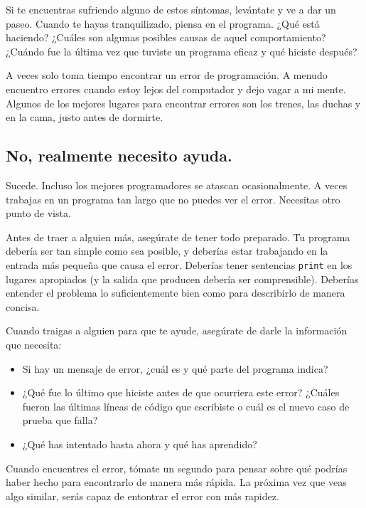 \documentclass[10pt]{book}
\begin{document}
Si te encuentras sufriendo alguno de estos síntomas, levántate
y ve a dar un paseo.  Cuando te hayas tranquilizado, piensa en el programa.
¿Qué está haciendo?  ¿Cuáles son algunas posibles causas de aquel
comportamiento?  ¿Cuándo fue la última vez que tuviste un programa eficaz
y qué hiciste después?

A veces solo toma tiempo encontrar un error de programación.  A menudo
encuentro errores cuando estoy lejos del computador y dejo vagar a mi mente.
Algunos de los mejores lugares para encontrar errores son los trenes, las
duchas y en la cama, justo antes de dormirte.


\subsection{No, realmente necesito ayuda.}

Sucede.  Incluso los mejores programadores se atascan ocasionalmente.
A veces trabajas en un programa tan largo que no puedes ver el
error.  Necesitas otro punto de vista.

Antes de traer a alguien más, asegúrate de tener todo preparado.
Tu programa debería ser tan simple
como sea posible, y deberías estar trabajando en la entrada más pequeña
que causa el error.  Deberías tener sentencias {\tt print} en los
lugares apropiados (y la salida que producen debería ser
comprensible).  Deberías entender el problema lo suficientemente bien
como para describirlo de manera concisa.

Cuando traigas a alguien para que te ayude, asegúrate de darle
la información que necesita:

\begin{itemize}

\item Si hay un mensaje de error, ¿cuál es
y qué parte del programa indica?

\item ¿Qué fue lo último que hiciste antes de que ocurriera este error?
¿Cuáles fueron las últimas líneas de código que escribiste o cuál es
el nuevo caso de prueba que falla?

\item ¿Qué has intentado hasta ahora y qué has aprendido?

\end{itemize}

Cuando encuentres el error, tómate un segundo para pensar sobre qué
podrías haber hecho para encontrarlo de manera más rápida.  La próxima vez
que veas algo similar, serás capaz de entontrar el error con más rapidez.
\end{document}
